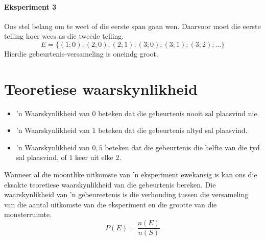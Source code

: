 
\paragraph{Eksperiment 3} Ons stel belang om te weet of die eerste span gaan wen. Daarvoor moet die eerste telling hoer wees as die tweede telling.
\[E=\{(1;0);(2;0);(2;1);(3;0);(3;1);(3;2);\ldots\}\]
Hierdie gebeurtenis-versameling is oneindg groot.


\section{Teoretiese waarskynlikheid}
\begin{itemize}
\item 'n Waarskynlikheid van $0$ beteken dat die gebeurtenis nooit sal plaasvind nie.
\item 'n Waarskynlikheid van $1$ beteken dat die gebeurtenis altyd sal plaasvind.
\item 'n Waarskynlikheid van $0,5$ beteken dat die gebeurtenis die helfte van die tyd sal plaasvind, of $1$ keer uit elke $2$.
\end{itemize}

Wanneer al die moontlike uitkomste van 'n eksperiment ewekansig is kan ons die eksakte teoretiese waarskynlikheid van die gebeurtenis bereken. Die waarskynlikheid van 'n gebeureetenis is die verhouding tussen die versameling van die aantal uitkomste van die eksperiment en die grootte van die monsterruimte.
\[P(E) = \frac{n(E)}{n(S)}\]

